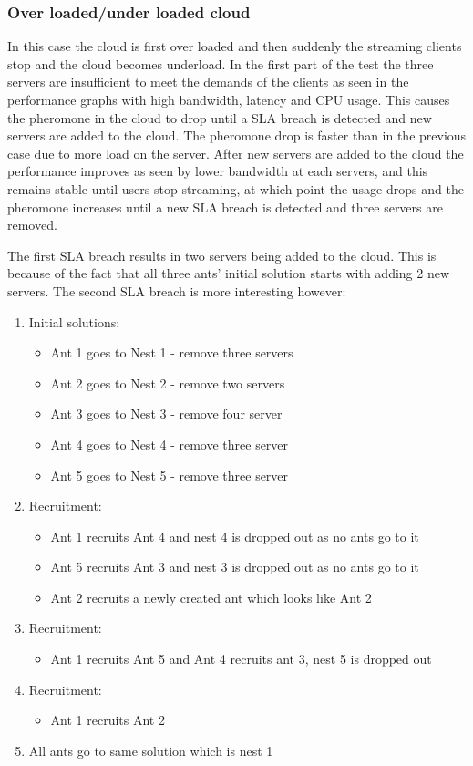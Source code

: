 \subsubsection{Over loaded/under loaded cloud}

In this case the cloud is first over loaded and then suddenly the streaming clients stop and the cloud becomes underload. In the first part of the test the three servers are insufficient to meet the demands of the clients as seen in the performance graphs with high bandwidth, latency and CPU usage. This causes the pheromone in the cloud to drop until a SLA breach is detected and new servers are added to the cloud. The pheromone drop is faster than in the previous case due to more load on the server. After new servers are added to the cloud the performance improves as seen by lower bandwidth at each servers, and this remains stable until users stop streaming, at which point the usage drops and the pheromone increases until a new SLA breach is detected and three servers are removed.

The first SLA breach results in two servers being added to the cloud. This is because of the fact that all three ants' initial solution starts with adding 2 new servers. The second SLA breach is more interesting however:

\begin{enumerate}
	\item Initial solutions: 
	\begin{itemize}
		\item Ant 1 goes to Nest 1 - remove three servers
		\item Ant 2 goes to Nest 2 - remove two servers
		\item Ant 3 goes to Nest 3 - remove four server
		\item Ant 4 goes to Nest 4 - remove three server
		\item Ant 5 goes to Nest 5 - remove three server
	\end{itemize}
	\item Recruitment:
	\begin{itemize}
		\item Ant 1 recruits Ant 4 and nest 4 is dropped out as no ants go to it
		\item Ant 5 recruits Ant 3 and nest 3 is dropped out as no ants go to it
		\item Ant 2 recruits a newly created ant which looks like Ant 2
	\end{itemize}
	\item Recruitment:
	\begin{itemize}
		\item Ant 1 recruits Ant 5 and Ant 4 recruits ant 3, nest 5 is dropped out
	\end{itemize}
	\item Recruitment:
	\begin{itemize}
		\item Ant 1 recruits Ant 2
	\end{itemize}
	\item All ants go to same solution which is nest 1
\end{enumerate}

